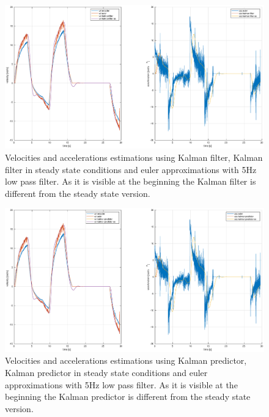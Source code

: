\documentclass[a4paper,12pt]{article}
\begin{document}
\begin{figure}[H]
    \begin{center}
        \hspace*{-4.6cm}
        \includegraphics[scale=0.5]{images/kalman_filter.eps}
    \end{center}
    \caption{Velocities and accelerations estimations using Kalman filter, Kalman filter in steady state conditions and euler approximations with 5Hz low pass filter. As it is visible at the beginning the Kalman filter is different from the steady state version.}
    \label{fig:kalman_filter}
\end{figure}

\begin{figure}[H]
    \begin{center}
        \hspace*{-4.6cm}
        \includegraphics[scale=0.5]{images/kalman_predictor.eps}
    \end{center}
    \caption{Velocities and accelerations estimations using Kalman predictor, Kalman predictor in steady state conditions and euler approximations with 5Hz low pass filter. As it is visible at the beginning the Kalman predictor is different from the steady state version.}
    \label{fig:kalman_predictor}
\end{figure}
\end{document}
